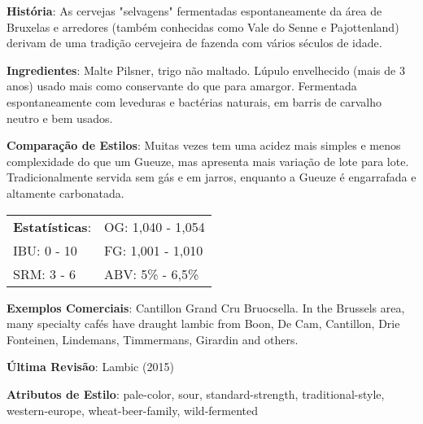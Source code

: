 \textbf{História}: As cervejas "selvagens" fermentadas espontaneamente da área de Bruxelas e arredores (também conhecidas como Vale do Senne e Pajottenland) derivam de uma tradição cervejeira de fazenda com vários séculos de idade.

\textbf{Ingredientes}: Malte Pilsner, trigo não maltado. Lúpulo envelhecido (mais de 3 anos) usado mais como conservante do que para amargor. Fermentada espontaneamente com leveduras e bactérias naturais, em barris de carvalho neutro e bem usados.

\textbf{Comparação de Estilos}: Muitas vezes tem uma acidez mais simples e menos complexidade do que um Gueuze, mas apresenta mais variação de lote para lote. Tradicionalmente servida sem gás e em jarros, enquanto a Gueuze é engarrafada e altamente carbonatada.

\begin{tabular}{@{}p{35mm}p{35mm}@{}}
  \textbf{Estatísticas}: & OG: 1,040 - 1,054 \\
  IBU: 0 - 10  & FG: 1,001 - 1,010  \\
  SRM: 3 - 6  & ABV: 5\% - 6,5\%
\end{tabular}

\textbf{Exemplos Comerciais}: Cantillon Grand Cru Bruocsella. In the Brussels area, many specialty cafés have draught lambic from Boon, De Cam, Cantillon, Drie Fonteinen, Lindemans, Timmermans, Girardin and others.

\textbf{Última Revisão}: Lambic (2015)

\textbf{Atributos de Estilo}: pale-color, sour, standard-strength, traditional-style, western-europe, wheat-beer-family, wild-fermented
